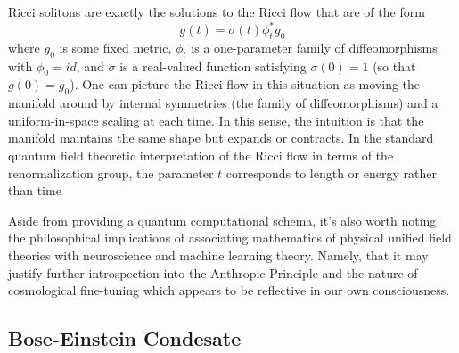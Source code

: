 \documentclass{article}
\begin{document}
    Ricci solitons are exactly the solutions to the Ricci flow that are of the form
    \begin{equation}
        g(t)=\sigma(t)\phi^{*}_tg_0
    \end{equation}
    where $g_0$ is some fixed metric, $\phi_t$ is a one-parameter family of diffeomorphisms with $\phi_0=id$, and $\sigma$ is a real-valued function satisfying $\sigma(0)=1$ (so that $g(0)=g_0$). One can picture the Ricci flow in this situation as moving the manifold around by internal symmetries (the family of diffeomorphisms) and a uniform-in-space scaling at each time. In this sense, the intuition is that the manifold maintains the same shape but expands or contracts. In the standard quantum field theoretic interpretation of the Ricci flow in terms of the renormalization group, the parameter $t$ corresponds to length or energy rather than time

    Aside from providing a quantum computational schema, it's also worth noting the philosophical implications of associating mathematics of physical unified field theories with neuroscience and machine learning theory. Namely, that it  may justify further introspection into the Anthropic Principle and the nature of cosmological fine-tuning which appears to be reflective in our own consciousness.

    
    \subsection{Bose-Einstein Condesate}
    
    
\end{document}

